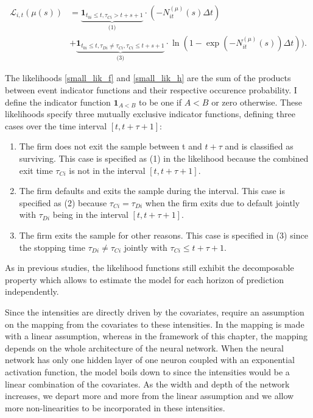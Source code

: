 \begin{align} \label{small_lik_h}
\mathcal{L}_{i,t}(\mu(s)) &= \underbrace{\textbf{1}_{t_{0i} \leq t,\tau_{Ci} > t + s +1}}_\textrm{(1)} \cdot (-N_{it}^{(\mu)}(s) \Delta t)\\ \nonumber
&+ \underbrace{\textbf{1}_{t_{0i} \leq t, \tau_{Di} \neq \tau_{Ci}, \tau_{Ci} \leq t+s+1}}_\textrm{(3)} \cdot \ln(1-\exp(-N_{it}^{(\mu)}(s))\Delta t)).
\end{align}

The likelihoods \eqref{small_lik_f} and \eqref{small_lik_h} are the sum of the products between event indicator functions and their respective occurence probability. I define the indicator function $\textbf{1}_{A<B}$ to be one if $A<B$ or zero otherwise. These likelihoods specify three mutually exclusive indicator functions, defining three cases over the time interval $[t,t+\tau+1]$:
\begin{enumerate}
\item The firm does not exit the sample between t and $t+\tau$ and is classified as surviving. This case is specified as (1) in the likelihood because the combined exit time $\tau_{Ci}$ is not in the interval $[t,t+\tau+1]$.
\item The firm defaults and exits the sample during the interval. This case is specified as (2) because $\tau_{Ci}=\tau_{Di}$ when the firm exits due to default jointly with $\tau_{Di}$ being in the interval $[t,t+\tau+1]$.
\item The firm exits the sample for other reasons. This case is specified in (3) since the stopping time $\tau_{Di} \neq \tau_{Ci}$ jointly with $\tau_{Ci} \leq t+\tau+1$.
\end{enumerate}

As in previous studies, the likelihood functions still exhibit the decomposable property which allows to estimate the model for each horizon of prediction independently.

Since the intensities are directly driven by the covariates, \citet{Duan2012} require an assumption on the mapping from the covariates to these intensities. In \citet{Duan2012} the mapping is made with a linear assumption, whereas in the framework of this chapter, the mapping depends on the whole architecture of the neural network. When the neural network has only one hidden layer of one neuron coupled with an exponential activation function, the model boils down to \citet{Duan2012} since the intensities would be a linear combination of the covariates. As the width and depth of the network increases, we depart more and more from the linear assumption and we allow more non-linearities to be incorporated in these intensities. \\ 

